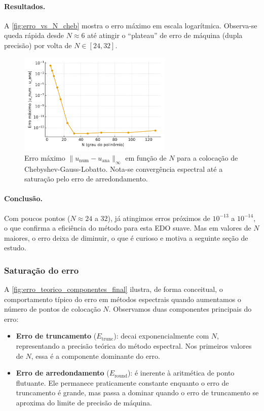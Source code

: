 \documentclass[11pt,a4paper]{article}
\begin{document}
\paragraph{Resultados.}
A \autoref{fig:erro_vs_N_cheb} mostra o erro máximo em escala logarítmica. Observa-se queda rápida desde $N\approx 6$ até atingir o “plateau” de erro de máquina (dupla precisão) por volta de $N\in[24,32]$.

\begin{figure}[H]
    \centering
    \includegraphics[width=0.65\textwidth]{figures/erro_vs_N_chebyshev.png}
    \caption{Erro máximo $\|u_{\text{num}}-u_{\text{ana}}\|_{\infty}$ em função de $N$ para a colocação de Chebyshev-Gauss-Lobatto. Nota-se convergência espectral até a saturação pelo erro de arredondamento.}
    \label{fig:erro_vs_N_cheb}
\end{figure}

\paragraph{Conclusão.}
Com poucos pontos ($N\approx 24$ a $32$), já atingimos erros próximos de $10^{-13}$ a $10^{-14}$, o que confirma a eficiência do método para esta EDO suave. Mas em valores de $N$ maiores, o erro deixa de diminuir, o que é curioso e motiva a seguinte seção de estudo.

\subsubsection{Saturação do erro}

A \autoref{fig:erro_teorico_componentes_final} ilustra, de forma conceitual, o comportamento típico do erro em métodos espectrais quando aumentamos o número de pontos de colocação $N$.  
Observamos duas componentes principais do erro:

\begin{itemize}
    \item \textbf{Erro de truncamento} ($E_{\mathrm{trunc}}$): decai exponencialmente com $N$, representando a precisão teórica do método espectral. Nos primeiros valores de $N$, essa é a componente dominante do erro.
    \item \textbf{Erro de arredondamento} ($E_{\mathrm{round}}$): é inerente à aritmética de ponto flutuante. Ele permanece praticamente constante enquanto o erro de truncamento é grande, mas passa a dominar quando o erro de truncamento se aproxima do limite de precisão de máquina.
\end{itemize}
\end{document}
